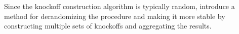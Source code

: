 \documentclass[review]{elsarticle}
\begin{document}
Since the knockoff construction algorithm is typically random, \citet{ren2023derandomizing} introduce a method for derandomizing the procedure and making it more stable by constructing multiple sets of knockoffs and aggregating the results.



%
%
%
%
%
%
\end{document}
